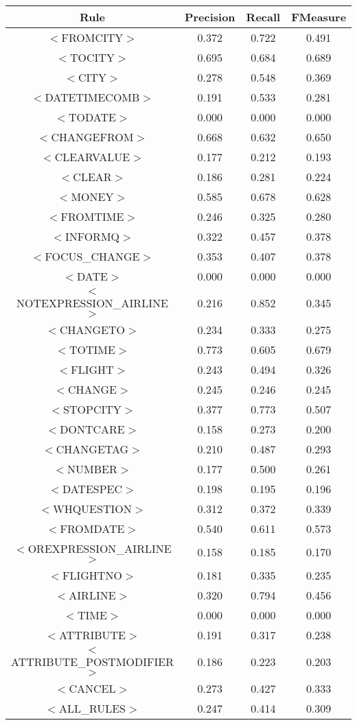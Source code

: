 \documentclass[a4paper,10pt]{article}
\begin{document}
 \label{tab:title} 
\begin{center}
\begin{tabular}{|c||c|c|c|}
\hline
Rule&Precision&Recall&FMeasure\\
\hline
\hline
$<$FROMCITY$>$&0.372&0.722&0.491 \\
\hline$<$TOCITY$>$&0.695&0.684&0.689 \\
\hline$<$CITY$>$&0.278&0.548&0.369 \\
\hline$<$DATETIMECOMB$>$&0.191&0.533&0.281 \\
\hline$<$TODATE$>$&0.000&0.000&0.000 \\
\hline$<$CHANGEFROM$>$&0.668&0.632&0.650 \\
\hline$<$CLEARVALUE$>$&0.177&0.212&0.193 \\
\hline$<$CLEAR$>$&0.186&0.281&0.224 \\
\hline$<$MONEY$>$&0.585&0.678&0.628 \\
\hline$<$FROMTIME$>$&0.246&0.325&0.280 \\
\hline$<$INFORMQ$>$&0.322&0.457&0.378 \\
\hline$<$FOCUS\_CHANGE$>$&0.353&0.407&0.378 \\
\hline$<$DATE$>$&0.000&0.000&0.000 \\
\hline$<$NOTEXPRESSION\_AIRLINE$>$&0.216&0.852&0.345 \\
\hline$<$CHANGETO$>$&0.234&0.333&0.275 \\
\hline$<$TOTIME$>$&0.773&0.605&0.679 \\
\hline$<$FLIGHT$>$&0.243&0.494&0.326 \\
\hline$<$CHANGE$>$&0.245&0.246&0.245 \\
\hline$<$STOPCITY$>$&0.377&0.773&0.507 \\
\hline$<$DONTCARE$>$&0.158&0.273&0.200 \\
\hline$<$CHANGETAG$>$&0.210&0.487&0.293 \\
\hline$<$NUMBER$>$&0.177&0.500&0.261 \\
\hline$<$DATESPEC$>$&0.198&0.195&0.196 \\
\hline$<$WHQUESTION$>$&0.312&0.372&0.339 \\
\hline$<$FROMDATE$>$&0.540&0.611&0.573 \\
\hline$<$OREXPRESSION\_AIRLINE$>$&0.158&0.185&0.170 \\
\hline$<$FLIGHTNO$>$&0.181&0.335&0.235 \\
\hline$<$AIRLINE$>$&0.320&0.794&0.456 \\
\hline$<$TIME$>$&0.000&0.000&0.000 \\
\hline$<$ATTRIBUTE$>$&0.191&0.317&0.238 \\
\hline$<$ATTRIBUTE\_POSTMODIFIER$>$&0.186&0.223&0.203 \\
\hline$<$CANCEL$>$&0.273&0.427&0.333 \\
\hline
\hline
$<$ALL\_RULES$>$&0.247&0.414&0.309 \\
\hline
\end{tabular}
\end{center}
\end{document}
